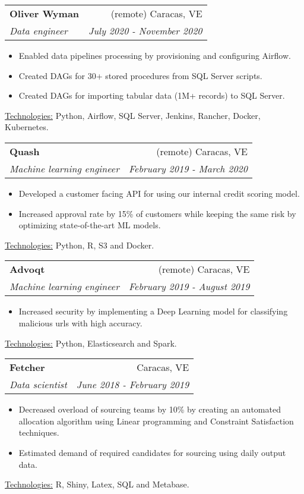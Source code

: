 \documentclass[letterpaper,11pt]{article}
\makeatletter
\newcommand{\sepsection}{\vspace{25pt}}
\newcommand{\resumeItem}[1]{%
  \item\small{
    #1
  }
}
\newcommand{\resumeSubheading}[4]{
  \vspace{8pt}\item%
    \begin{tabular*}{0.97\textwidth}[t]{l@{\extracolsep{\fill}}r}
      \textbf{#1} & #2 \\
      \textit{\small#3} & \textit{\small #4} \\
    \end{tabular*}\vspace{-5pt}
}
\newcommand{\resumeItemListStart}{\begin{itemize}}
\newcommand{\resumeItemListEnd}{\end{itemize}\vspace{-5pt}}
\newcommand{\resumeTech}[2]{
 \underline{#1:} #2
}
\makeatother
\begin{document}
\newpage
    \resumeSubheading
      {Oliver Wyman}{(remote) Caracas, VE}
      {Data engineer}{July 2020 - November 2020}
      \resumeItemListStart
      \resumeItem{Enabled data pipelines processing by provisioning and configuring Airflow.}
      \resumeItem{Created DAGs for 30+ stored procedures from SQL Server scripts.}
      \resumeItem{Created DAGs for importing tabular data (1M+ records) to SQL Server.}
      \resumeItemListEnd
      \resumeTech{Technologies}{Python, Airflow, SQL Server, Jenkins, Rancher, Docker, Kubernetes.}\\

    \sepsection

    \resumeSubheading
      {Quash}{(remote) Caracas, VE}
      {Machine learning engineer}{February 2019 - March 2020}
      \resumeItemListStart
      \resumeItem{Developed a customer facing API for using our internal credit scoring model.}
      \resumeItem{Increased approval rate by 15\% of customers while keeping the same risk by optimizing state-of-the-art ML models.}
      \resumeItemListEnd
      \resumeTech{Technologies}{Python, R, S3 and Docker.}\\

    \sepsection

    \resumeSubheading
      {Advoqt}{(remote) Caracas, VE}
      {Machine learning engineer}{February 2019 - August 2019}
      \resumeItemListStart
      \resumeItem{Increased security by implementing a Deep Learning model for classifying malicious urls with high accuracy.}
      \resumeItemListEnd
      \resumeTech{Technologies}{Python, Elasticsearch and Spark.}\\

    \sepsection

    \resumeSubheading
      {Fetcher}{Caracas, VE}
      {Data scientist}{June 2018 - February 2019}
      \resumeItemListStart
      \resumeItem{Decreased overload of sourcing teams by 10\% by creating an automated allocation algorithm using Linear programming and Constraint Satisfaction techniques.}
      \resumeItem{Estimated demand of required candidates for sourcing using daily output data.}
      \resumeItemListEnd
      \resumeTech{Technologies}{R, Shiny, Latex, SQL and Metabase.}\\
\end{document}
